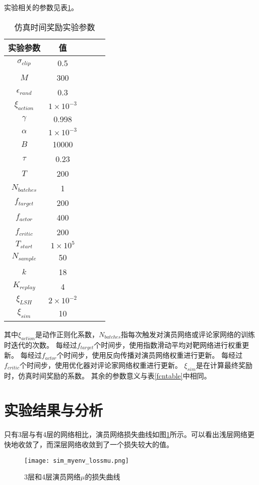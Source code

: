 实验相关的参数见表\ref{simtable}。
    \begin{table}[htbp]
        \caption{仿真时间奖励实验参数}
        \label{simtable}
    \vspace{0.5em}\centering\wuhao
    \begin{tabular}{ccccc}
    \toprule[1.5pt]
    实验参数 & 值\\
    \midrule[1pt]
        $\sigma_{clip}$ & 0.5\\
        $M$ & 300\\
        $\epsilon_{rand}$ & 0.3\\
        $\xi_{action}$ & $1\times 10^{-3}$\\
        $\gamma$ & 0.998\\
        $\alpha$ & $1\times 10^{-3}$\\
        $B$ & 10000\\
        $\tau$ & 0.23\\
        $T$ & 200\\
        $N_{batches}$ & 1\\
        $f_{target}$ & 200\\
        $f_{actor}$ & 400\\
        $f_{critic}$ & 200\\
        $T_{start}$ & $1\times 10^5$\\
        $N_{sample}$ & 50 \\
        $k$ & 18\\
        $K_{replay}$ & 4\\
        $\xi_{LSH}$ & $2\times 10^{-2}$\\
        $\xi_{sim}$ & 10\\
    \bottomrule[1.5pt]
    \end{tabular}
    \end{table}
    其中$\xi_{action}$是动作正则化系数，$N_{batches}$指每次触发对演员网络或评论家网络的训练时迭代的次数。
    每经过$f_{target}$个时间步，使用指数滑动平均对靶网络进行权重更新。
    每经过$f_{actor}$个时间步，使用反向传播对演员网络权重进行更新。
    每经过$f_{critic}$个时间步，使用优化器对评论家网络权重进行更新。
    $\xi_{sim}$是在计算最终奖励时，仿真时间奖励的系数。
    其余的参数意义与表\ref{fcntable}中相同。
\section{实验结果与分析}

只有3层与有4层的网络相比，演员网络损失曲线如图\ref{simlossmu}所示。可以看出浅层网络更快地收敛了，而深层网络收敛到了一个损失较大的值。
        \begin{figure}
        \centering
        \texttt{[image: sim\_myenv\_lossmu.png]}
        \caption{3层和4层演员网络$\mu$的损失曲线}
            \label{simlossmu}
        \end{figure}


